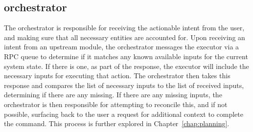 \subsection{orchestrator}

The orchestrator is responsible for receiving the actionable intent from the user, and making
sure that all necessary entities are accounted for. Upon receiving an intent from an
upstream module, the orchestrator messages the executor via a RPC queue to determine if it
matches any known available inputs for the current system state. If there is one, as part of
the response, the executor will include the necessary inputs for executing that action. The orchestrator
then takes this response and compares the list of necessary inputs to the list of received inputs,
determining if there are any missing. If there are any missing inputs, the orchestrator is then
responsible for attempting to reconcile this, and if not possible, surfacing back to the user a
request for additional context to complete the command. This process is further explored in 
Chapter~\ref{chap:planning}.
